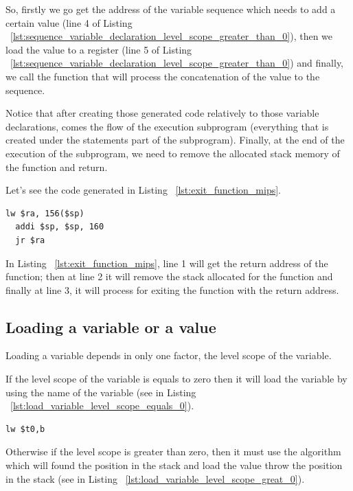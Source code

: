 \documentclass[
  oneside,
  11pt, a4paper,
  footinclude=true,
  headinclude=true,
  cleardoublepage=empty
]{scrbook}
\begin{document}
So, firstly we go get the address of the variable sequence which needs to add a certain value (line 4 of Listing ~\ref{lst:sequence_variable_declaration_level_scope_greater_than_0}), then we load the value to a register (line 5 of Listing ~\ref{lst:sequence_variable_declaration_level_scope_greater_than_0}) and finally, we call the function that will process the concatenation of the value to the sequence.

Notice that after creating those generated code relatively to those variable declarations, comes the flow of the execution subprogram (everything that is created under the statements part of the subprogram). Finally, at the end of the execution of the subprogram, we need to remove the allocated stack memory of the function and return.

Let's see the code generated in Listing ~\ref{lst:exit_function_mips}.

\begin{lstlisting}[caption={Exiting the function in MIPS assembly code},label={lst:exit_function_mips}]
  lw $ra, 156($sp)		
  addi $sp, $sp, 160		
  jr $ra	
\end{lstlisting}

In Listing ~\ref{lst:exit_function_mips}, line 1 will get the return address of the function; then at line 2 it will remove the stack allocated for the function and finally at line 3, it will process for exiting the function with the return address.





\subsection{Loading a variable or a value}

Loading a variable depends in only one factor, the level scope of the variable.

If the level scope of the variable is equals to zero then it will load the variable by using the name of the variable (see in Listing ~\ref{lst:load_variable_level_scope_equals_0}).

\begin{lstlisting}[caption={Loading a variable with level scope equals to zero},label={lst:load_variable_level_scope_equals_0}]
  lw $t0,b
\end{lstlisting}

Otherwise if the level scope is greater than zero, then it must use the algorithm which will found the position in the stack and load the value throw the position in the stack (see in Listing ~\ref{lst:load_variable_level_scope_great_0}).
\end{document}
